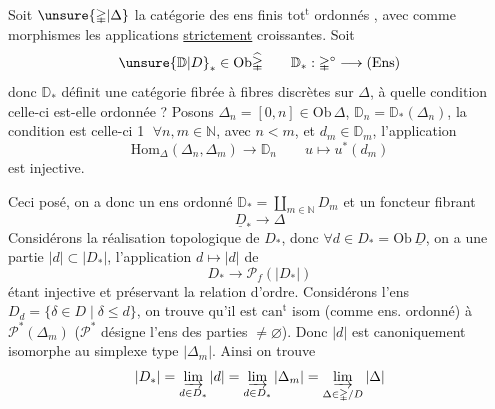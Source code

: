 Soit $\unsure{\mathbb{\Delta}|\Delta}$ la catégorie des ens finis $\mathrm{tot}^{\mathrm t}$ ordonnés , avec comme morphismes les applications \uline{strictement} croissantes.
Soit
\[
\unsure{\mathbb D|D}_{*}\in\mathrm{Ob}\widehat{\mathbb{\Delta}}
\qquad \mathbb D_*:\mathbb{\Delta}^{\circ}\longrightarrow(\mathrm{Ens})
\]
donc $\mathbb D_*$ définit une catégorie fibrée à fibres discrètes sur $\mathbb{\Delta}$, à quelle condition celle-ci est-elle ordonnée  ? Posons $\Delta_n=[0,n]\in\mathrm{Ob}\,\mathbb{\Delta}$, $\mathbb D_n=\mathbb D_*(\Delta_n)$, la condition est celle-ci
\textcircled{1} $\forall n,m\in\mathbb N$, avec $n<m$, et $d_m\in\mathbb D_m$, l'application
\[
\mathrm{Hom}_{\mathbb{\Delta}}(\Delta_n,\Delta_m)\longrightarrow\mathbb D_n
\qquad u\longmapsto u^*(d_m)
\]
est injective.

Ceci posé, on a donc un ens ordonné $\mathbb D_*=\coprod_{m\in\mathbb N}D_m$ et un foncteur fibrant
\[
\underline{D}_*\longrightarrow\mathbb{\Delta}
\]
Considérons la réalisation topologique  de $D_*$, donc $\forall d\in D_*=\mathrm{Ob}\,\underline D$, on a une partie  $|d|\subset|D_*|$, l'application $d\longmapsto|d|$ de
\[
D_*\longrightarrow\mathscr P_f(|D_*|)
\]
étant injective et préservant la relation d'ordre.
Considérons  l'ens $D_d=\{\delta\in D\mid\delta\leq d\}$, on trouve qu'il est $\mathrm{can}^{\mathrm t}$ isom (comme ens. ordonné) à $\mathscr P^*(\Delta_m)$ ($\mathscr P^*$ désigne l'ens des parties $\ne\varnothing$).
Donc $|d|$ est canoniquement isomorphe au simplexe type $|\Delta_m|$. Ainsi on trouve
\[
|D_*|=\varinjlim_{d\in D_*}|d|=\varinjlim_{d\in D_*}|\Delta_m|
=\varinjlim_{\Delta\in\mathbb{\Delta}/D}|\Delta|
\]
